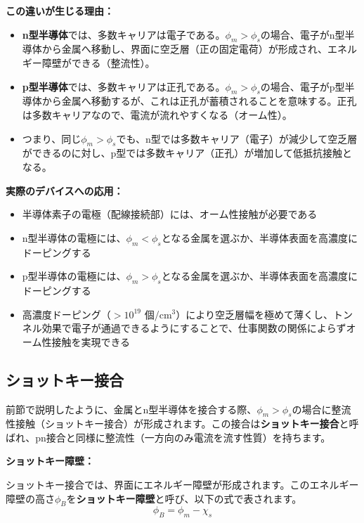 \textbf{この違いが生じる理由：}

\begin{itemize}
\item \textbf{n型半導体}では、多数キャリアは電子である。$\phi_m > \phi_s$の場合、電子がn型半導体から金属へ移動し、界面に空乏層（正の固定電荷）が形成され、エネルギー障壁ができる（整流性）。

\item \textbf{p型半導体}では、多数キャリアは正孔である。$\phi_m > \phi_s$の場合、電子がp型半導体から金属へ移動するが、これは正孔が蓄積されることを意味する。正孔は多数キャリアなので、電流が流れやすくなる（オーム性）。

\item つまり、同じ$\phi_m > \phi_s$でも、n型では多数キャリア（電子）が減少して空乏層ができるのに対し、p型では多数キャリア（正孔）が増加して低抵抗接触となる。
\end{itemize}

\textbf{実際のデバイスへの応用：}

\begin{itemize}
\item 半導体素子の電極（配線接続部）には、オーム性接触が必要である
\item n型半導体の電極には、$\phi_m < \phi_s$となる金属を選ぶか、半導体表面を高濃度にドーピングする
\item p型半導体の電極には、$\phi_m > \phi_s$となる金属を選ぶか、半導体表面を高濃度にドーピングする
\item 高濃度ドーピング（$> 10^{19}$ 個/cm$^3$）により空乏層幅を極めて薄くし、トンネル効果で電子が通過できるようにすることで、仕事関数の関係によらずオーム性接触を実現できる
\end{itemize}

\subsection{ショットキー接合}

前節で説明したように、金属とn型半導体を接合する際、$\phi_m > \phi_s$の場合に整流性接触（ショットキー接合）が形成されます。この接合は\textbf{ショットキー接合}と呼ばれ、pn接合と同様に整流性（一方向のみ電流を流す性質）を持ちます。

\textbf{ショットキー障壁：}

ショットキー接合では、界面にエネルギー障壁が形成されます。このエネルギー障壁の高さ$\phi_B$を\textbf{ショットキー障壁}と呼び、以下の式で表されます。
\begin{equation}
\phi_B = \phi_m - \chi_s
\end{equation}

